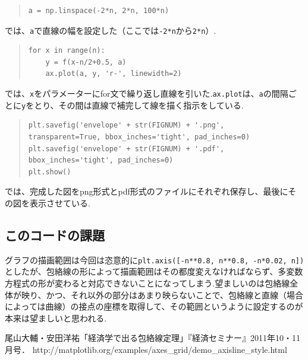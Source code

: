 \documentclass[11pt,a4j,fleqn]{jarticle}
\begin{document}
\begin{quote}
\begin{verbatim}
a = np.linspace(-2*n, 2*n, 100*n)
\end{verbatim}
\end{quote}
では、\verb|a|で直線の幅を設定した（ここでは\verb|-2*n|から\verb|2*n|）.

\begin{quote}
\begin{verbatim}
for x in range(n):
    y = f(x-n/2+0.5, a)
    ax.plot(a, y, 'r-', linewidth=2)
\end{verbatim}
\end{quote}
では、\verb|x|をパラメーターにfor文で繰り返し直線を引いた.\verb|ax.plot|は、\verb|a|の間隔ごとに\verb|y|をとり、その間は直線で補完して線を描く指示をしている.

\begin{quote}
\begin{verbatim}
plt.savefig('envelope' + str(FIGNUM) + '.png', 
transparent=True, bbox_inches='tight', pad_inches=0)
plt.savefig('envelope' + str(FIGNUM) + '.pdf', 
bbox_inches='tight', pad_inches=0)
plt.show()
\end{verbatim}
\end{quote}
では、完成した図をpng形式とpdf形式のファイルにそれぞれ保存し、最後にその図を表示させている.

\subsection{このコードの課題}
グラフの描画範囲は今回は恣意的に\verb|plt.axis([-n**0.8, n**0.8, -n*0.02, n])|としたが、包絡線の形によって描画範囲はその都度変えなければならず、多変数方程式の形が変わると対応できないことになってしまう.望ましいのは包絡線全体が映り、かつ、それ以外の部分はあまり映らないことで、包絡線と直線（場合によっては曲線）の接点の座標を取得して、その範囲というように設定するのが本来は望ましいと思われる.

\begin{thebibliography}{0}
尾山大輔・安田洋祐「経済学で出る包絡線定理」『経済セミナー』2011年10・11月号．
http://matplotlib.org/examples/axes\_grid/demo\_axisline\_style.html
\end{thebibliography}
\end{document}
